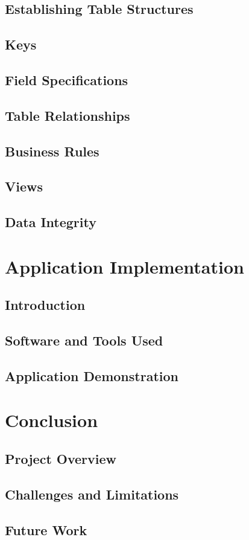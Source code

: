\documentclass[12pt]{article}
\begin{document}
\subsection{Establishing Table Structures}
\subsection{Keys}
\subsection{Field Specifications}
\subsection{Table Relationships}
\subsection{Business Rules}
\subsection{Views}
\subsection{Data Integrity}

\section{Application Implementation}
\subsection{Introduction}
\subsection{Software and Tools Used}
\subsection{Application Demonstration}

\section{Conclusion}
\subsection{Project Overview}
\subsection{Challenges and Limitations}
\subsection{Future Work}

\newpage


\end{document}
